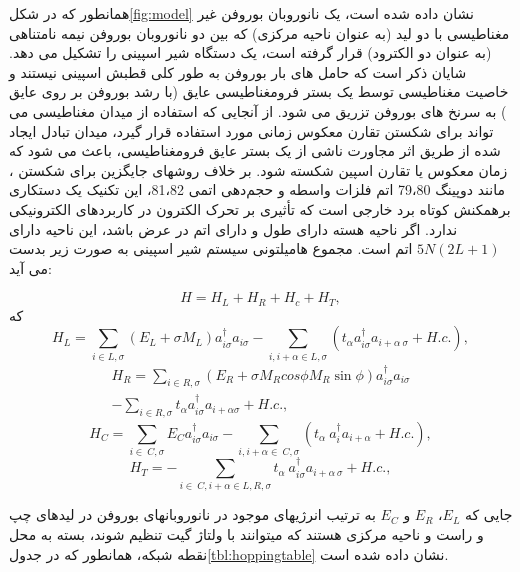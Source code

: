 همانطور که در شکل\ref{fig:model} نشان داده شده است، یک نانوروبان بوروفن غیر مغناطیسی  با دو لید (به عنوان ناحیه مرکزی) که بین دو نانوروبان بوروفن  نیمه نامتناهی (به عنوان دو الکترود) قرار گرفته است، یک دستگاه شیر اسپینی را تشکیل می دهد. شایان ذکر است که حامل های بار بوروفن به طور کلی قطبش اسپینی نیستند و خاصیت مغناطیسی توسط یک بستر فرومغناطیسی عایق (با رشد بوروفن بر روی عایق ) به سرنخ های بوروفن تزریق می شود. از آنجایی که استفاده از میدان مغناطیسی می تواند برای شکستن تقارن معکوس زمانی مورد استفاده قرار گیرد، میدان تبادل ایجاد شده از طریق اثر مجاورت ناشی از یک بستر عایق فرومغناطیسی، باعث می شود که زمان معکوس یا تقارن اسپین شکسته شود. بر خلاف روشهای جایگزین برای شکستن ، مانند دوپینگ 79،80 اتم فلزات واسطه و حجم‌دهی اتمی 81،82، این تکنیک یک دستکاری برهمکنش کوتاه برد خارجی است که تأثیری بر تحرک الکترون در کاربردهای الکترونیکی ندارد. اگر ناحیه هسته دارای طول  و دارای  اتم در عرض باشد، این ناحیه دارای $5 N (2L + 1)$ اتم است. مجموع هامیلتونی سیستم شیر اسپینی به صورت زیر بدست می آید:

\begin{equation}
  H= H_L + H_R + H_c + H_T,
\end{equation}
که
\begin{equation}
H_{L}=\sum\limits_{i\in L,\sigma }{\left( E_{L}+\sigma M_{L} \right)} a_{i\sigma }^{\dagger} a_{i\sigma }-\sum\limits_{i,i+\alpha \in L,\sigma}{\left( t_{\alpha } a_{i\sigma}^{\dagger} a_{i+\alpha \ \sigma }+H.c.\right)},
\end{equation}
\begin{equation}
\begin{split}
H_{R}=\sum_{i\in R,\sigma}{\left( E_{R}+\sigma M_{R} cos\phi M_{R}\sin \phi\right)} a_{i\sigma}^{\dagger} a_{i\sigma } \\
-\sum_{i\in R,\sigma} t_{\alpha } a_{i\sigma}^{\dagger} a_{i+\alpha\sigma}+H.c.,
\end{split}
\end{equation}
\begin{equation}
H_{C}=\sum_{i\in \ C,\sigma }{{{E}_{C}}}a_{i\sigma }^{\dagger}{{a}_{i\sigma }}-\sum_{i,i+\alpha \in \ C,\sigma }{({{t}_{\alpha }}\ a_{i}^{\dagger }{{a}_{i+\alpha }}+H.c.)},
\end{equation}
\begin{equation}
H_{T}=-\sum_{i\in \ C,i+\alpha \in L,R,\sigma}{{{t}_{\alpha }}}\ a_{i\sigma }^{\dagger }{{a}_{i+\alpha \ \sigma }}+H.c.,
\end{equation}

جایی که $E_L$، $E_R$ و $E_C$ به ترتیب انرژیهای موجود در نانوروبانهای بوروفن در لیدهای چپ و راست و ناحیه مرکزی هستند که میتوانند با ولتاژ گیت تنظیم شوند، بسته به محل نقطه شبکه، همانطور که در جدول\ref{tbl:hoppingtable} نشان داده شده است.


